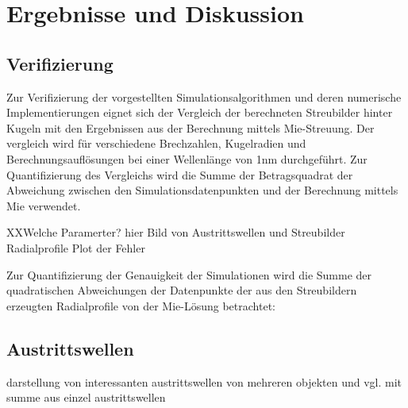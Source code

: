 \section{Ergebnisse und Diskussion}
\subsection{Verifizierung}
Zur Verifizierung der vorgestellten Simulationsalgorithmen und deren numerische Implementierungen eignet sich der Vergleich der berechneten Streubilder hinter Kugeln mit den Ergebnissen aus der Berechnung mittels Mie-Streuung. Der vergleich wird für verschiedene Brechzahlen, Kugelradien und Berechnungsauflösungen bei einer Wellenlänge von 1\si{nm} durchgeführt.
Zur Quantifizierung des Vergleichs wird die Summe der Betragsquadrat der Abweichung zwischen den Simulationsdatenpunkten und der Berechnung mittels Mie verwendet.


XXWelche Paramerter?
hier Bild von Austrittswellen und Streubilder
Radialprofile
Plot der Fehler

Zur Quantifizierung der Genauigkeit der Simulationen wird die Summe der quadratischen Abweichungen der Datenpunkte der aus den Streubildern erzeugten Radialprofile von der Mie-Lösung betrachtet:


\subsection{Austrittswellen}
darstellung von interessanten austrittswellen von mehreren objekten und vgl. mit summe aus einzel austrittswellen